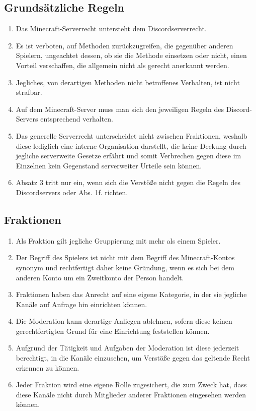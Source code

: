 \documentclass{article}
\begin{document}
\subsection{Grundsätzliche Regeln}
\begin{enumerate}[(1)]
	\item Das Minecraft-Serverrecht untersteht dem Discordserverrecht.
	\item Es ist verboten, auf Methoden zurückzugreifen, die gegenüber anderen Spielern, ungeachtet dessen, ob sie die Methode einsetzen oder nicht, einen Vorteil verschaffen, die allgemein nicht als gerecht anerkannt werden.
	\item Jegliches, von derartigen Methoden nicht betroffenes Verhalten, ist nicht strafbar.
	\item Auf dem Minecraft-Server muss man sich den jeweiligen Regeln des Discord-Servers entsprechend verhalten.
	\item Das generelle Serverrecht unterscheidet nicht zwischen Fraktionen, weshalb diese lediglich eine interne Organisation darstellt, die keine Deckung durch jegliche serverweite Gesetze erfährt und somit Verbrechen gegen diese im Einzelnen kein Gegenstand serverweiter Urteile sein können.
	\item Absatz 3 tritt nur ein, wenn sich die Verstöße nicht gegen die Regeln des Discordservers oder Abs. 1f. richten.
\end{enumerate}

\subsection{Fraktionen}
\begin{enumerate}[(1)]
	\item Als Fraktion gilt jegliche Gruppierung mit mehr als einem Spieler.
	\item Der Begriff des Spielers ist nicht mit dem Begriff des Minecraft-Kontos synonym und rechtfertigt daher keine Gründung, wenn es sich bei dem anderen Konto um ein Zweitkonto der Person handelt.
	\item Fraktionen haben das Anrecht auf eine eigene Kategorie, in der sie jegliche Kanäle auf Anfrage hin einrichten können.
	\item Die Moderation kann derartige Anliegen ablehnen, sofern diese keinen gerechtfertigten Grund für eine Einrichtung feststellen können.
	\item Aufgrund der Tätigkeit und Aufgaben der Moderation ist diese jederzeit berechtigt, in die Kanäle einzusehen, um Verstöße gegen das geltende Recht erkennen zu können.
	\item Jeder Fraktion wird eine eigene Rolle zugesichert, die zum Zweck hat, dass diese Kanäle nicht durch Mitglieder anderer Fraktionen eingesehen werden können.
\end{enumerate}
\end{document}
